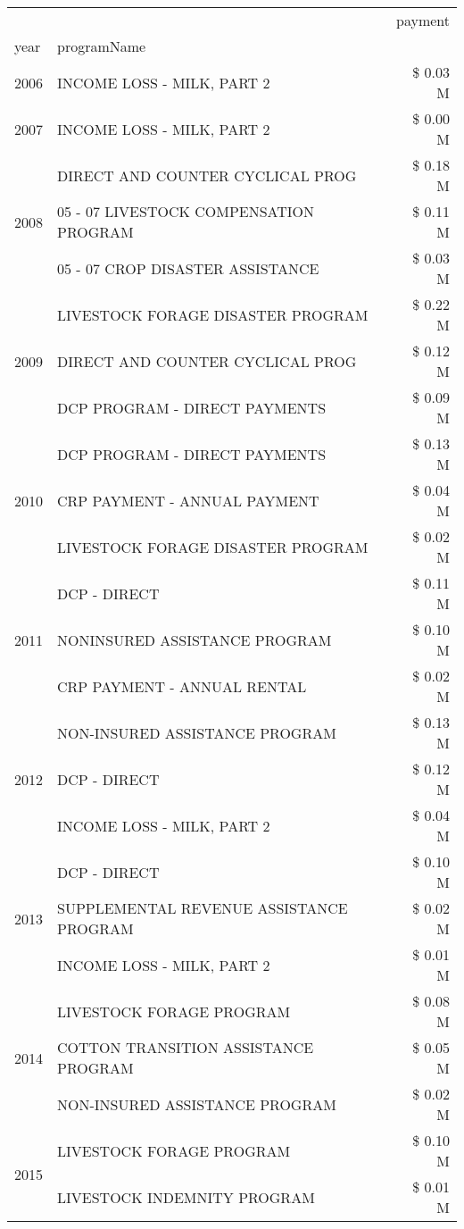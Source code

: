 \begin{tabular}{llr}
\toprule
 &  & payment \\
year & programName &  \\
\midrule
2006 & INCOME LOSS - MILK, PART 2 & \$ 0.03 M \\
\cline{1-3}
2007 & INCOME LOSS - MILK, PART 2 & \$ 0.00 M \\
\cline{1-3}
\multirow[t]{3}{*}{2008} & DIRECT AND COUNTER CYCLICAL PROG & \$ 0.18 M \\
 & 05 - 07 LIVESTOCK COMPENSATION PROGRAM & \$ 0.11 M \\
 & 05 - 07 CROP DISASTER ASSISTANCE & \$ 0.03 M \\
\cline{1-3}
\multirow[t]{3}{*}{2009} & LIVESTOCK FORAGE DISASTER  PROGRAM & \$ 0.22 M \\
 & DIRECT AND COUNTER CYCLICAL PROG & \$ 0.12 M \\
 & DCP PROGRAM - DIRECT PAYMENTS & \$ 0.09 M \\
\cline{1-3}
\multirow[t]{3}{*}{2010} & DCP PROGRAM - DIRECT PAYMENTS & \$ 0.13 M \\
 & CRP PAYMENT - ANNUAL PAYMENT & \$ 0.04 M \\
 & LIVESTOCK FORAGE DISASTER  PROGRAM & \$ 0.02 M \\
\cline{1-3}
\multirow[t]{3}{*}{2011} & DCP - DIRECT & \$ 0.11 M \\
 & NONINSURED ASSISTANCE PROGRAM & \$ 0.10 M \\
 & CRP PAYMENT - ANNUAL RENTAL & \$ 0.02 M \\
\cline{1-3}
\multirow[t]{3}{*}{2012} & NON-INSURED ASSISTANCE PROGRAM & \$ 0.13 M \\
 & DCP - DIRECT & \$ 0.12 M \\
 & INCOME LOSS - MILK, PART 2 & \$ 0.04 M \\
\cline{1-3}
\multirow[t]{3}{*}{2013} & DCP - DIRECT & \$ 0.10 M \\
 & SUPPLEMENTAL REVENUE ASSISTANCE PROGRAM & \$ 0.02 M \\
 & INCOME LOSS - MILK, PART 2 & \$ 0.01 M \\
\cline{1-3}
\multirow[t]{3}{*}{2014} & LIVESTOCK FORAGE PROGRAM & \$ 0.08 M \\
 & COTTON TRANSITION ASSISTANCE PROGRAM & \$ 0.05 M \\
 & NON-INSURED ASSISTANCE PROGRAM & \$ 0.02 M \\
\cline{1-3}
\multirow[t]{3}{*}{2015} & LIVESTOCK FORAGE PROGRAM & \$ 0.10 M \\
 & LIVESTOCK INDEMNITY PROGRAM & \$ 0.01 M \\

\end{tabular}
